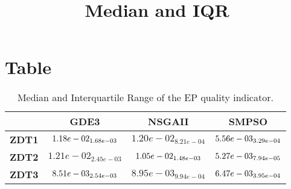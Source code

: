 \documentclass{article}
\title{Median and IQR}
\author{}
\begin{document}
\maketitle
\section{Table}
\begin{table}[!htp]
  \caption{Median and Interquartile Range of the EP quality indicator.}
  \label{table:EP}
  \centering
  \begin{scriptsize}
  \begin{tabular}{c|ccc}
      & \textbf{GDE3} & \textbf{NSGAII} & \textbf{SMPSO} \\\hline
      \textbf{ZDT1} & $\cellcolor{gray25} 1.18e-02_{1.68e-03} $ & $ 1.20e-02_{8.21e-04} $ & $ \cellcolor{gray95} 5.56e-03_{3.29e-04}$ \\
      \textbf{ZDT2} & $1.21e-02_{2.45e-03} $ & $ \cellcolor{gray25} 1.05e-02_{1.48e-03} $ & $ \cellcolor{gray95} 5.27e-03_{7.94e-05}$ \\
      \textbf{ZDT3} & $\cellcolor{gray25} 8.51e-03_{2.54e-03} $ & $ 8.95e-03_{9.94e-04} $ & $ \cellcolor{gray95} 6.47e-03_{3.95e-04}$ \\
  \end{tabular}
  \end{scriptsize}
\end{table}
\end{document}
